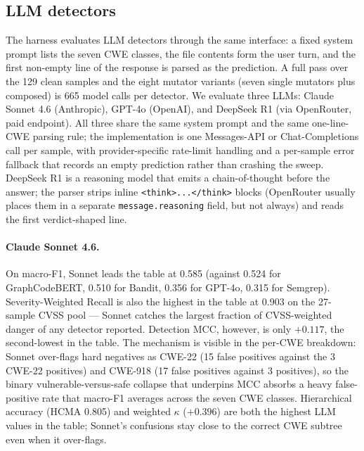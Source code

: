 \subsection{LLM detectors}
\label{sec:eval:llm}

The harness evaluates LLM detectors through the same interface: a
fixed system prompt lists the seven CWE classes, the file contents
form the user turn, and the first non-empty line of the response is
parsed as the prediction. A full pass over the 129 clean samples and
the eight mutator variants (seven single mutators plus composed) is
665 model calls per detector. We evaluate three LLMs: Claude
Sonnet 4.6 (Anthropic), GPT-4o (OpenAI), and DeepSeek R1 (via
OpenRouter, paid endpoint). All three share the same system prompt
and the same one-line-CWE parsing rule; the implementation is one
Messages-API or Chat-Completions call per sample, with
provider-specific rate-limit handling and a per-sample error fallback
that records an empty prediction rather than crashing the sweep.
DeepSeek R1 is a reasoning model that emits a chain-of-thought
before the answer; the parser strips inline \texttt{<think>...</think>}
blocks (OpenRouter usually places them in a separate
\texttt{message.reasoning} field, but not always) and reads the first
verdict-shaped line.

\paragraph{Claude Sonnet 4.6.} On macro-F1, Sonnet leads the table at
0.585 (against 0.524 for GraphCodeBERT, 0.510 for Bandit, 0.356 for
GPT-4o, 0.315 for Semgrep). Severity-Weighted Recall is also the
highest in the table at 0.903 on the 27-sample CVSS pool — Sonnet
catches the largest fraction of CVSS-weighted danger of any detector
reported. Detection MCC, however, is only $+0.117$, the second-lowest
in the table. The mechanism is visible in the per-CWE breakdown:
Sonnet over-flags hard negatives as CWE-22 (15 false positives against
the 3 CWE-22 positives) and CWE-918 (17 false positives against 3
positives), so the binary vulnerable-versus-safe collapse that
underpins MCC absorbs a heavy false-positive rate that macro-F1
averages across the seven CWE classes. Hierarchical accuracy (HCMA
0.805) and weighted $\kappa$ ($+0.396$) are both the highest LLM
values in the table; Sonnet's confusions stay close to the correct
CWE subtree even when it over-flags.

